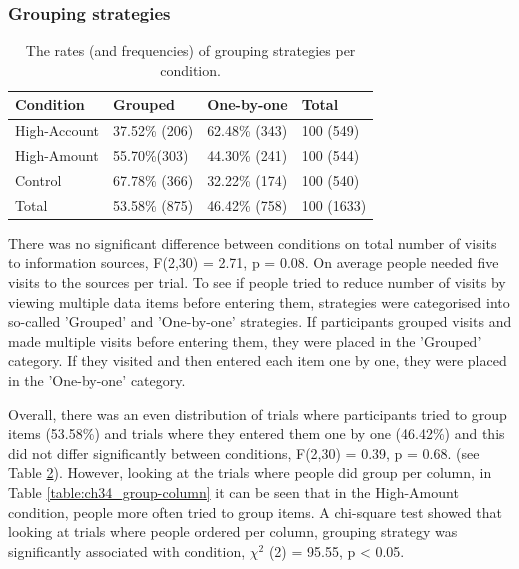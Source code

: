 \begin{table}
\begin{itemize}
\subsubsection{Grouping strategies}
\begin{table}[!ht]
\centering
\begin{tabular}{|l|l|l|l|}
\hline
Condition    & Grouped       & One-by-one     & Total      \\ \hline
High-Account & 37.52\% {\footnotesize (206)} & 62.48\% {\footnotesize (343)}  & 100 {\footnotesize (549)}  \\ \hline
High-Amount  & 55.70\%{\footnotesize  (303)} & 44.30\% {\footnotesize (241)}  & 100 {\footnotesize (544)}  \\ \hline
Control      & 67.78\% {\footnotesize (366)} & 32.22\% {\footnotesize (174)}  & 100 {\footnotesize (540)}  \\ \hline
Total        & 53.58\% {\footnotesize (875)} & 46.42\% {\footnotesize (758)} & 100 {\footnotesize (1633)} \\ \hline
\end{tabular}
\caption{The rates (and frequencies) of grouping strategies per condition.}\label{table:ch34_group-total}
\end{table}

There was no significant difference between conditions on total number of visits to information sources, F(2,30) = 2.71, p = 0.08. On average people needed five visits to the sources per trial.
To see if people tried to reduce number of visits by viewing multiple data items before entering them, strategies were categorised into so-called 'Grouped' and 'One-by-one' strategies. If participants grouped visits and made multiple visits before entering them, they were placed in the 'Grouped' category. If they visited and then entered each item one by one, they were placed in the 'One-by-one' category.

Overall, there was an even distribution of trials where participants tried to group items (53.58\%) and trials where they entered them one by one (46.42\%) and this did not differ significantly between conditions, F(2,30) = 0.39, p = 0.68. (see Table \ref{table:ch34_group-total}). However, looking at the trials where people did group per column, in Table \ref{table:ch34_group-column} it can be seen that in the High-Amount condition, people more often tried to group items. A chi-square test showed that looking at trials where people ordered per column, grouping strategy was significantly associated with condition, $\chi^2$ (2) = 95.55, p < 0.05. 


\end{itemize}
\end{table}
